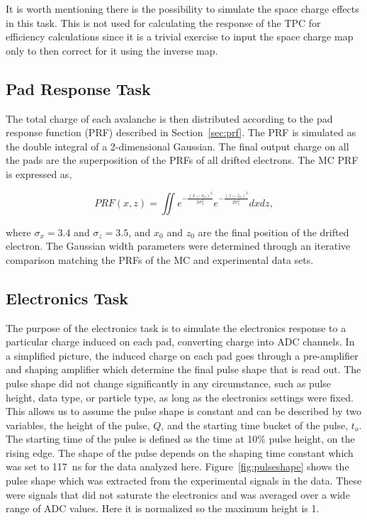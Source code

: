 It is worth mentioning there is the possibility to simulate the space charge effects in this task. This is not used for calculating the response of the TPC for efficiency calculations since it is a trivial exercise to input the space charge map only to then correct for it using the inverse map.  

\subsection{Pad Response Task}
The total charge of each avalanche is then distributed according to the pad response function (PRF) described in Section~\ref{sec:prf}. The PRF is simulated as the double integral of a 2-dimensional Gaussian. The final output charge on all the pads are the superposition of the PRFs of all drifted electrons. The MC PRF is expressed as, 

\begin{equation}
PRF(x,z) = \iint e^{-\frac{(x-x_o)^2}{2\sigma_x^2}} e^{-\frac{(z-z_o)^2}{2\sigma_z^2}}dxdz,
\end{equation}

where $\sigma_x = 3.4$ and $\sigma_z = 3.5$, and $x_0$ and $z_0$ are the final position of the drifted electron. The Gaussian width parameters were determined through an iterative comparison matching the PRFs of the MC and experimental data sets. 


\subsection{Electronics Task}

The purpose of the electronics task is to simulate the electronics response to a particular charge induced on each pad, converting charge into ADC channels. In a simplified picture, the induced charge on each pad goes through a pre-amplifier and shaping amplifier which determine the final pulse shape that is read out. The pulse shape did not change significantly in any circumstance, such as pulse height, data type, or particle type, as long as the electronics settings were fixed. This allows us to assume the pulse shape is constant and can be described by two variables, the height of the pulse, $Q$, and the starting time bucket of the pulse, $t_o$. The starting time of the pulse is defined as the time at 10\% pulse height, on the rising edge. The shape of the pulse depends on the shaping time constant which was set to \SI{117}{\nano\second} for the data analyzed here. Figure~\ref{fig:pulseshape} shows the pulse shape which was extracted from the experimental signals in the data. These were signals that did not saturate the electronics and was averaged over a wide range of ADC values. Here it is normalized so the maximum height is 1. 



